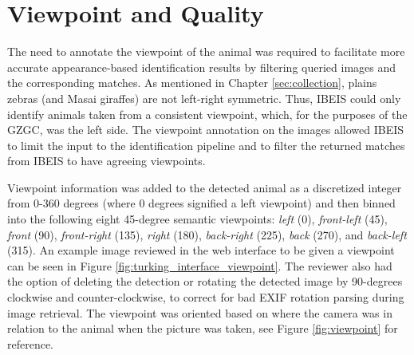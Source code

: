 \section{Viewpoint and Quality}
The need to annotate the viewpoint of the animal was required to facilitate more accurate appearance-based identification results by filtering queried images and the corresponding matches.  As mentioned in Chapter \ref{sec:collection}, plains zebras (and Masai giraffes) are not left-right symmetric.  Thus, IBEIS could only identify animals taken from a consistent viewpoint, which, for the purposes of the GZGC, was the left side.  The viewpoint annotation on the images allowed IBEIS to limit the input to the identification pipeline and to filter the returned matches from IBEIS to have agreeing viewpoints.

Viewpoint information was added to the detected animal as a discretized integer from 0-360 degrees (where 0 degrees signified a left viewpoint) and then binned into the following eight 45-degree semantic viewpoints: \textit{left} (0), \textit{front-left} (45), \textit{front} (90), \textit{front-right} (135), \textit{right} (180), \textit{back-right} (225), \textit{back} (270), and \textit{back-left} (315).  An example image reviewed in the web interface to be given a viewpoint can be seen in Figure \ref{fig:turking_interface_viewpoint}.  The reviewer also had the option of deleting the detection or rotating the detected image by 90-degrees clockwise and counter-clockwise, to correct for bad EXIF rotation parsing during image retrieval.  The viewpoint was oriented based on where the camera was in relation to the animal when the picture was taken, see Figure \ref{fig:viewpoint} for reference.

